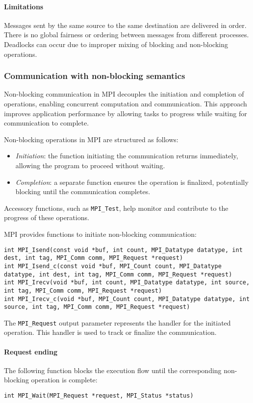\paragraph*{Limitations}
Messages sent by the same source to the same destination are delivered in order.
There is no global fairness or ordering between messages from different processes.
Deadlocks can occur due to improper mixing of blocking and non-blocking operations.

\subsubsection{Communication with non-blocking semantics}
Non-blocking communication in MPI decouples the initiation and completion of operations, enabling concurrent computation and communication. 
This approach improves application performance by allowing tasks to progress while waiting for communication to complete.

Non-blocking operations in MPI are structured as follows:
\begin{itemize}
    \item \textit{Initiation}: the function initiating the communication returns immediately, allowing the program to proceed without waiting.
    \item \textit{Completion}: a separate function ensures the operation is finalized, potentially blocking until the communication completes.
\end{itemize}
Accessory functions, such as \texttt{MPI\_Test}, help monitor and contribute to the progress of these operations.

MPI provides functions to initiate non-blocking communication:
\begin{lstlisting}[style=C]
int MPI_Isend(const void *buf, int count, MPI_Datatype datatype, int dest, int tag, MPI_Comm comm, MPI_Request *request)
int MPI_Isend_c(const void *buf, MPI_Count count, MPI_Datatype datatype, int dest, int tag, MPI_Comm comm, MPI_Request *request)
int MPI_Irecv(void *buf, int count, MPI_Datatype datatype, int source, int tag, MPI_Comm comm, MPI_Request *request)
int MPI_Irecv_c(void *buf, MPI_Count count, MPI_Datatype datatype, int source, int tag, MPI_Comm comm, MPI_Request *request)
\end{lstlisting}
The \texttt{MPI\_Request} output parameter represents the handler for the initiated operation. 
This handler is used to track or finalize the communication.

\paragraph*{Request ending}
The following function blocks the execution flow until the corresponding non-blocking operation is complete:
\begin{lstlisting}[style=C]
int MPI_Wait(MPI_Request *request, MPI_Status *status)
\end{lstlisting}

